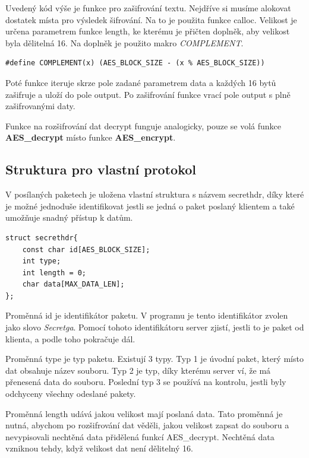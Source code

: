\documentclass[11pt, a4paper]{article}
\begin{document}
Uvedený kód výše je funkce pro zašifrování textu. Nejdříve si musíme alokovat dostatek místa pro výsledek šifrování. Na to je použita funkce calloc. Velikost je určena parametrem funkce length, ke kterému je přičten doplněk, aby velikost byla dělitelná 16. Na doplněk je použito makro \emph{COMPLEMENT}.


\begin{verbatim}
#define COMPLEMENT(x) (AES_BLOCK_SIZE - (x % AES_BLOCK_SIZE))
\end{verbatim}


Poté funkce iteruje skrze pole zadané parametrem data a každých 16 bytů zašifruje a uloží do pole output. Po zašifrování funkce vrací pole output s plně zašifrovanými daty.

Funkce na rozšifrování dat decrypt funguje analogicky, pouze se volá funkce \textbf{AES\_decrypt} místo funkce \textbf{AES\_encrypt}.

\subsection{Struktura pro vlastní protokol}
V posílaných paketech je uložena vlastní struktura s názvem secrethdr, díky které je možné jednoduše identifikovat jestli se jedná o paket poslaný klientem a také umožňuje snadný přístup k datům.

\vspace{0.5cm}

\begin{verbatim}
struct secrethdr{
    const char id[AES_BLOCK_SIZE];
    int type;
    int length = 0;
    char data[MAX_DATA_LEN];
};
\end{verbatim}


Proměnná id je identifikátor paketu. V programu je tento identifikátor zvolen jako slovo \emph{Secretga}. Pomocí tohoto identifikátoru server zjistí, jestli to je paket od klienta, a podle toho pokračuje dál.

Proměnná type je typ paketu. Existují 3 typy. Typ 1 je úvodní paket, který místo dat obsahuje název souboru. Typ 2 je typ, díky kterému server ví, že má přenesená data do souboru. Poslední typ 3 se používá na kontrolu, jestli byly odchyceny všechny odeslané pakety.

Proměnná length udává jakou velikost mají poslaná data. Tato proměnná je nutná, abychom po rozšifrování dat věděli, jakou velikost zapsat do souboru a nevypisovali nechtěná data přidělená funkcí AES\_decrypt. Nechtěná data vzniknou tehdy, když velikost dat není dělitelný 16.
\end{document}
